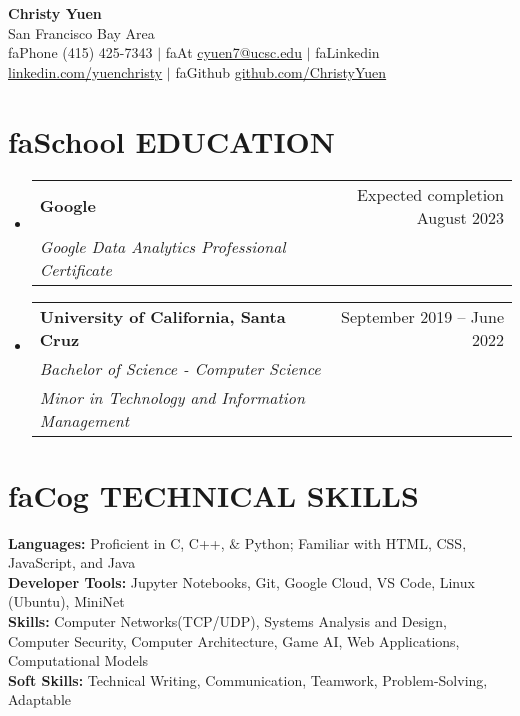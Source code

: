 \documentclass[a4paper,11pt]{article}
\makeatletter
\newcommand{\seticon}[1]{\textcolor{Cerulean}{\csname #1\endcsname}}
\newcommand{\resumeSubheading}[4]{
  \vspace{-2pt}\item
    \begin{tabular*}{0.97\textwidth}[t]{l@{\extracolsep{\fill}}r}
      \textbf{#1} & #2 \\
      \textit{\small#3} & \textnormal{\small #4} \\
    \end{tabular*}\vspace{-8pt}
}
\newcommand{\resumeSub}[6]{ %
  \vspace{-2pt}\item
    \begin{tabular*}{0.97\textwidth}[t]{l@{\extracolsep{\fill}}r}
      \textbf{#1} & #2 \\
      \textit{\small#3} & \textnormal{\small #4} \\
      \textit{\small#5} & \textnormal{\small #6} \\
    \end{tabular*} \vspace{-8pt}
}
\newcommand{\resumeSubHeadingListStart}{\begin{itemize}[leftmargin=0.15in, label={}]}
\newcommand{\resumeSubHeadingListEnd}{\end{itemize}}
\makeatother
\begin{document}
\iffalse
\begin{wrapfigure}{R}{0.15\textwidth}
\vspace{-25pt}
\texttt{[image: dp\_cropped]}
\end{wrapfigure}
\fi

\begin{center}
    \textbf{\Huge Christy Yuen} \\
    \normalfont San Francisco Bay Area \vspace{1pt} \\
    \small \seticon{faPhone} (415) 425-7343 $|$ 
    \seticon{faAt} \href{mailto:x@x.com}{\ul{cyuen7@ucsc.edu}} $|$ 
    \seticon{faLinkedin} 
    		\href{https://www.linkedin.com/in/yuenchristy/}{\ul{linkedin.com/yuenchristy}} $|$ 
    \seticon{faGithub} 
    		\href{https://github.com/ChristyYuen}{\ul{github.com/ChristyYuen}}
\end{center}
\vspace{-10pt}

\section{\seticon{faSchool} \textbf{EDUCATION}}
  \resumeSubHeadingListStart
  	\resumeSubheading
       {Google}{Expected completion August 2023}
       {Google Data Analytics Professional Certificate}{}
    \resumeSub
      {University of California, Santa Cruz}{September 2019 -- June 2022}
      {Bachelor of Science - Computer Science}{}
      {Minor in Technology and Information Management}{}   
  \resumeSubHeadingListEnd
\section{\seticon{faCog} \textbf{TECHNICAL SKILLS}} %
\begin{itemize}[leftmargin=0.15in, label={}]
    \small{\item{
     \textbf{Languages:}{ Proficient in C, C++, $\&$ Python; Familiar with HTML, CSS, JavaScript, and Java} \\		   
    \textbf{Developer Tools:}{ Jupyter Notebooks, Git, Google Cloud, VS Code, Linux (Ubuntu), MiniNet}\\
    \textbf{Skills:}{ Computer Networks(TCP/UDP), Systems Analysis and Design, Computer Security, Computer Architecture, Game AI, Web Applications, Computational Models}\\ 
    \textbf{Soft Skills:}{ Technical Writing, Communication, Teamwork, Problem-Solving, Adaptable}\\
    }}
 \end{itemize} 
 
\end{document}
